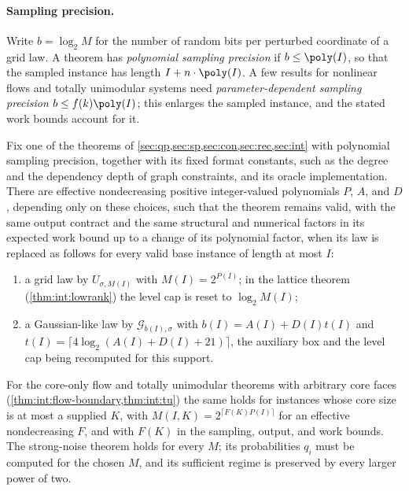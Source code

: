 \paragraph{Sampling precision.}
Write $b=\log_2M$ for the number of random bits per perturbed coordinate of a
grid law. A theorem has \emph{polynomial sampling precision} if
$b\le\poly(I)$, so that the sampled instance has length
$I+n\cdot\poly(I)$. A few results for nonlinear flows and totally
unimodular systems need \emph{parameter-dependent sampling precision}
$b\le f(k)\poly(I)$; this enlarges the sampled instance, and the stated work
bounds account for it.

\begin{proposition}\label{prop:model:uniform}
Fix one of the theorems of \cref{sec:qp,sec:sp,sec:con,sec:rec,sec:int}
with polynomial sampling precision, together with its fixed format
constants, such as the degree and the dependency depth of graph constraints,
and its oracle implementation. There are effective nondecreasing
positive integer-valued polynomials $P$, $A$, and $D$, depending only on these choices, such that the
theorem remains valid, with the same output contract and the same
structural and numerical factors in its expected work bound up to a change
of its polynomial factor, when its law is replaced as follows for every
valid base instance of length at most $I$:
\begin{enumerate}[label=(\alph*)]
\item a grid law by $U_{\sigma,M(I)}$ with $M(I)=2^{P(I)}$; in the lattice
theorem (\cref{thm:int:lowrank}) the level cap is reset to $\log_2M(I)$;
\item a Gaussian-like law by $\mathcal G_{b(I),\sigma}$ with
$b(I)=A(I)+D(I)t(I)$ and $t(I)=\lceil4\log_2(A(I)+D(I)+21)\rceil$, the
auxiliary box and the level cap being recomputed for this support.
\end{enumerate}
For the core-only flow and totally unimodular theorems with arbitrary core
faces (\cref{thm:int:flow-boundary,thm:int:tu}) the same holds for instances
whose core size is at most a supplied $K$, with $M(I,K)=2^{\lceil
F(K)P(I)\rceil}$ for an effective nondecreasing $F$, and with $F(K)$ in the
sampling, output, and work bounds. The strong-noise theorem holds for every
$M$; its probabilities $q_i$ must be computed for the chosen $M$, and its
sufficient regime is preserved by every larger power of two.
\end{proposition}

